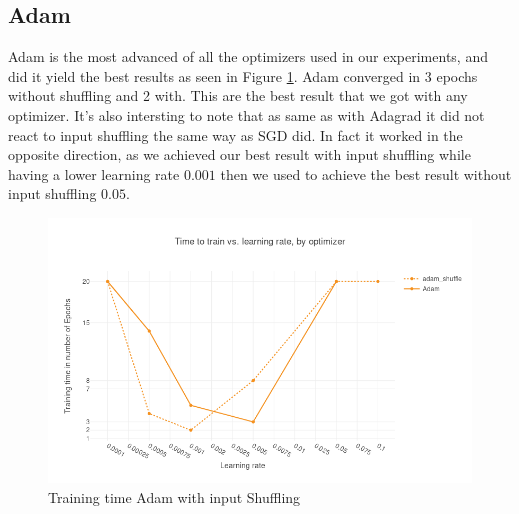 \subsection{Adam}
Adam is the most advanced of all the optimizers used in our experiments, and did it  yield the best results as seen in Figure \ref{fig:results_adam_shuffle}. Adam converged in 3 epochs without shuffling and 2 with. This are the best result that we got with any optimizer.  It's also intersting to note that as same as with Adagrad it did not react to input shuffling the same way as SGD did. In fact it worked in the opposite direction, as we achieved our best result with input shuffling while having a lower learning rate $0.001$ then we used to achieve the best result without input shuffling $0.05$.
\begin{figure}[h]
    \centering
			\includegraphics[scale=0.45]{images/results_adam_shuffle} 
    \caption{Training time Adam with input Shuffling}
    \label{fig:results_adam_shuffle}
\end{figure}